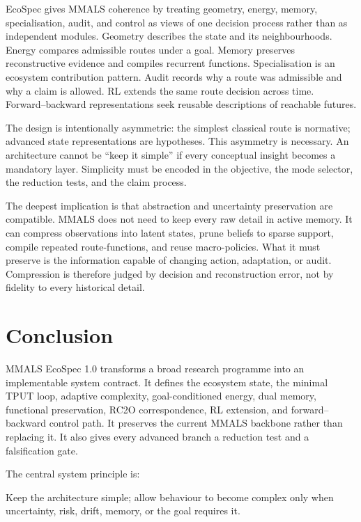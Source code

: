 \documentclass[10pt]{article}
\begin{document}
EcoSpec gives MMALS coherence by treating geometry, energy, memory, specialisation, audit, and control as views of one decision process rather than as independent modules. Geometry describes the state and its neighbourhoods. Energy compares admissible routes under a goal. Memory preserves reconstructive evidence and compiles recurrent functions. Specialisation is an ecosystem contribution pattern. Audit records why a route was admissible and why a claim is allowed. RL extends the same route decision across time. Forward--backward representations seek reusable descriptions of reachable futures.

The design is intentionally asymmetric: the simplest classical route is normative; advanced state representations are hypotheses. This asymmetry is necessary. An architecture cannot be ``keep it simple'' if every conceptual insight becomes a mandatory layer. Simplicity must be encoded in the objective, the mode selector, the reduction tests, and the claim process.

The deepest implication is that abstraction and uncertainty preservation are compatible. MMALS does not need to keep every raw detail in active memory. It can compress observations into latent states, prune beliefs to sparse support, compile repeated route-functions, and reuse macro-policies. What it must preserve is the information capable of changing action, adaptation, or audit. Compression is therefore judged by decision and reconstruction error, not by fidelity to every historical detail.

\section{Conclusion}

MMALS EcoSpec 1.0 transforms a broad research programme into an implementable system contract. It defines the ecosystem state, the minimal TPUT loop, adaptive complexity, goal-conditioned energy, dual memory, functional preservation, RC2O correspondence, RL extension, and forward--backward control path. It preserves the current MMALS backbone rather than replacing it. It also gives every advanced branch a reduction test and a falsification gate.

The central system principle is:

\begin{principlebox}
Keep the architecture simple; allow behaviour to become complex only when uncertainty, risk, drift, memory, or the goal requires it.
\end{principlebox}
\end{document}
